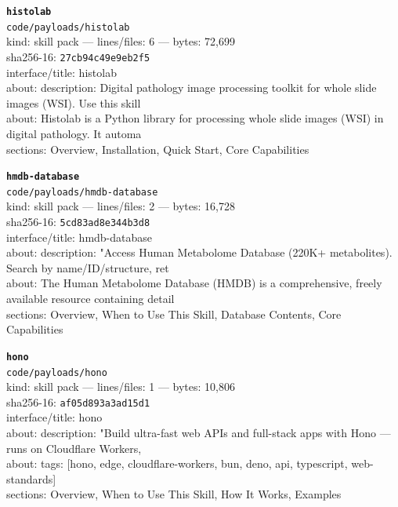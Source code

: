 \noindent\textbf{\texttt{histolab}}\\
\texttt{code/payloads/histolab}\\
kind: skill pack --- lines/files: 6 --- bytes: 72,699\\
sha256-16: \texttt{27cb94c49e9eb2f5}\\
interface/title: histolab\\
about: description: Digital pathology image processing toolkit for whole slide images (WSI). Use this skill\\
about: Histolab is a Python library for processing whole slide images (WSI) in digital pathology. It automa\\
sections: Overview, Installation, Quick Start, Core Capabilities\\
\vspace*{6.0pt}

\noindent\textbf{\texttt{hmdb-database}}\\
\texttt{code/payloads/hmdb-database}\\
kind: skill pack --- lines/files: 2 --- bytes: 16,728\\
sha256-16: \texttt{5cd83ad8e344b3d8}\\
interface/title: hmdb-database\\
about: description: "Access Human Metabolome Database (220K+ metabolites). Search by name/ID/structure, ret\\
about: The Human Metabolome Database (HMDB) is a comprehensive, freely available resource containing detail\\
sections: Overview, When to Use This Skill, Database Contents, Core Capabilities\\
\vspace*{6.0pt}
\newpage

\noindent\textbf{\texttt{hono}}\\
\texttt{code/payloads/hono}\\
kind: skill pack --- lines/files: 1 --- bytes: 10,806\\
sha256-16: \texttt{af05d893a3ad15d1}\\
interface/title: hono\\
about: description: "Build ultra-fast web APIs and full-stack apps with Hono — runs on Cloudflare Workers, \\
about: tags: [hono, edge, cloudflare-workers, bun, deno, api, typescript, web-standards]\\
sections: Overview, When to Use This Skill, How It Works, Examples\\
\vspace*{6.0pt}

